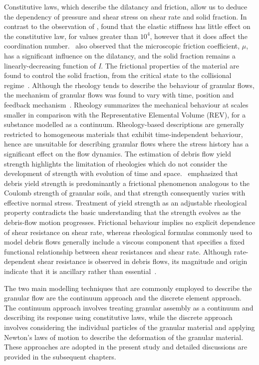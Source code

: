 Constitutive laws, which describe the dilatancy and friction, allow us to 
deduce the dependency of pressure and shear stress on shear rate and solid 
fraction. In contrast to the observation of \citet{Campbell2002}, 
\citet{DaCruz2005} found that the elastic stiffness has little effect on the 
constitutive law, for values greater than $10^{4}$, however that it does affect 
the coordination number.~\citet{DaCruz2005} also observed that the microscopic 
friction coefficient, $\mu$, has a significant influence on the dilatancy, and 
the solid fraction remains a linearly-decreasing function of \textit{I}. The 
frictional properties of the material are found to control the solid fraction, 
from the critical state to the collisional regime~\citep{DaCruz2005}. Although 
the rheology tends to describe the behaviour of granular flows, the mechanism 
of granular flows was found to vary with time, position and feedback 
mechanism~\citep{Iverson2003}. Rheology summarizes the mechanical behaviour at 
scales smaller in comparison with the Representative Elemental Volume (REV), 
for a substance modelled as a continuum. Rheology-based descriptions are 
generally restricted to homogeneous materials that exhibit time-independent 
behaviour, hence are unsuitable for describing granular flows where the stress 
history has a significant effect on the flow dynamics. The estimation of debris 
flow yield strength highlights the limitation of rheologies which do not 
consider the development of strength with evolution of time and 
space.~\citet{Johnson1965} emphasized that debris yield strength is 
predominantly a frictional phenomenon analogous to the Coulomb strength of 
granular soils, and that strength consequently varies with effective normal 
stress. Treatment of yield strength as an adjustable rheological property 
contradicts the basic understanding that the strength evolves as the 
debris-flow motion progresses. Frictional behaviour implies no explicit 
dependence of shear resistance on shear rate, whereas rheological formulas 
commonly used to model debris flows generally include a viscous component that 
specifies a fixed functional relationship between shear resistances and shear 
rate. Although rate-dependent shear resistance is observed in debris flows, its 
magnitude and origin indicate that it is ancillary rather than 
essential~\citep{Iverson2003}.

The two main modelling techniques that are commonly employed to describe the 
granular flow are the continuum approach and the discrete element approach. The 
continuum approach involves treating granular assembly as a continuum and 
describing its response using constitutive laws, while the discrete approach 
involves considering the individual particles of the granular material and 
applying Newton's laws of motion to describe the deformation of the granular 
material. These approaches are adopted in the present study and detailed 
discussions are provided in the subsequent chapters. 

